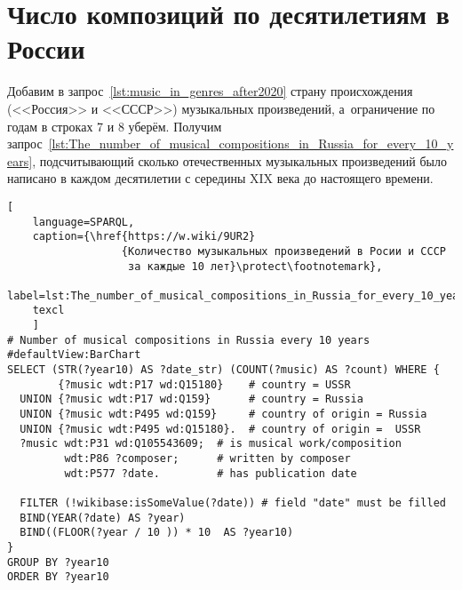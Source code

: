 


\section{Число композиций по десятилетиям в России}

Добавим в запрос~\ref{lst:music_in_genres_after2020} страну происхождения (<<Россия>> и <<СССР>>) 
музыкальных произведений, а~ограничение по годам в строках 7 и 8 уберём. 
Получим запрос~\ref{lst:The_number_of_musical_compositions_in_Russia_for_every_10_years}, 
подсчитывающий сколько отечественных музыкальных произведений было написано 
в каждом десятилетии с середины XIX века до настоящего времени.

\begin{lstlisting}[ 
    language=SPARQL,
    caption={\href{https://w.wiki/9UR2}
                  {Количество музыкальных произведений в Росии и СССР 
                   за каждые 10 лет}\protect\footnotemark},
    label=lst:The_number_of_musical_compositions_in_Russia_for_every_10_years,
    texcl 
    ]
# Number of musical compositions in Russia every 10 years
#defaultView:BarChart
SELECT (STR(?year10) AS ?date_str) (COUNT(?music) AS ?count) WHERE {
        {?music wdt:P17 wd:Q15180}    # country = USSR
  UNION {?music wdt:P17 wd:Q159}      # country = Russia
  UNION {?music wdt:P495 wd:Q159}     # country of origin = Russia
  UNION {?music wdt:P495 wd:Q15180}.  # country of origin =  USSR
  ?music wdt:P31 wd:Q105543609;  # is musical work/composition
         wdt:P86 ?composer;      # written by composer
         wdt:P577 ?date.         # has publication date

  FILTER (!wikibase:isSomeValue(?date)) # field "date" must be filled
  BIND(YEAR(?date) AS ?year)
  BIND((FLOOR(?year / 10 )) * 10  AS ?year10)
}
GROUP BY ?year10
ORDER BY ?year10
\end{lstlisting}%




